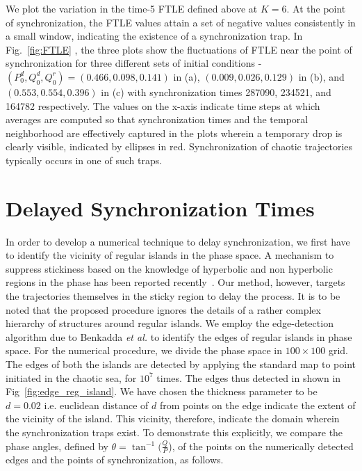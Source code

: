 \documentclass[reprint,superscriptaddress,amsmath,amssymb,aps,pre]{revtex4-1}
\begin{document}
We plot the variation in the time-5 FTLE defined above at $K = 6$. At the point of synchronization, the FTLE values attain a set of negative values consistently in a small window, indicating the existence of a synchronization trap.  In Fig.~\ref{fig:FTLE} , the three plots show the fluctuations  of FTLE near the point of synchronization for three different sets of initial conditions - $(P^d_0,Q^d_0,Q^r_0) = (0.466,0.098,0.141)$ in (a),  $(0.009,0.026,0.129)$ in (b), and $(0.553,0.554,0.396)$ in (c) with synchronization times 287090, 234521, and 164782 respectively. The values on the x-axis indicate time steps at which averages are computed so that synchronization times and the temporal neighborhood are effectively captured in the plots wherein a temporary drop is clearly visible, indicated by ellipses in red. Synchronization of chaotic trajectories typically occurs in one of such traps. 

\section{Delayed Synchronization Times}
\label{sec:delay}
In order to develop a numerical technique to delay synchronization, we  first 
have to identify the vicinity of regular islands in the phase space. A 
mechanism  to suppress stickiness based on the knowledge of hyperbolic and non 
hyperbolic regions in the phase has been reported recently~\cite{Kruger2015}. 
Our method, however, targets the trajectories themselves in the sticky region 
to delay the process.  It is to be noted that the proposed procedure ignores 
the details of a rather complex hierarchy of structures around regular 
islands. We employ the edge-detection algorithm due to Benkadda {\it et al.} 
\cite{Benkadda1997} to identify the edges of regular islands in phase space. 
For the numerical procedure, we divide the phase space in $100 \times 100$ 
grid. The edges of both the islands are detected by applying the standard map 
to point initiated in the chaotic sea, for $10^7$ times.  The edges thus 
detected in shown in Fig~\ref{fig:edge_reg_island}.  We have chosen the 
thickness parameter to be $d=0.02$ i.e. euclidean distance of $d$ from points 
on the edge indicate the extent of the vicinity of the island.  This vicinity, 
therefore, indicate the domain wherein the synchronization traps exist.  To 
demonstrate this explicitly, we compare the phase angles, defined by $\theta = 
\tan^{-1}(\frac{Q}{P}$), of the points on the numerically detected edges and 
the points of synchronization, as 
follows.
\end{document}
